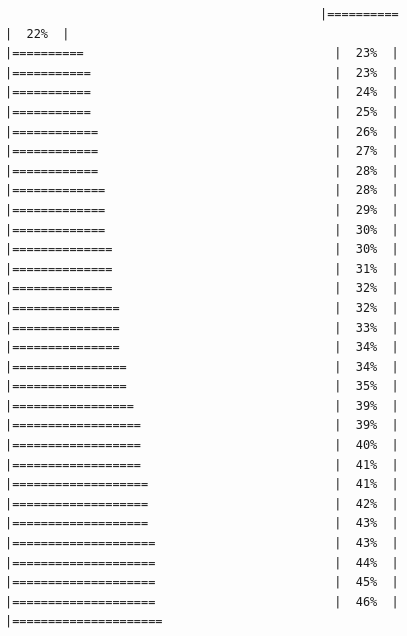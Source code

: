 \documentclass[
  krantz2]{krantz}
\begin{document}
\begin{verbatim}
                                            |==========                                   |  22%  |                                                     |==========                                   |  23%  |                                                     |===========                                  |  23%  |                                                     |===========                                  |  24%  |                                                     |===========                                  |  25%  |                                                     |============                                 |  26%  |                                                     |============                                 |  27%  |                                                     |============                                 |  28%  |                                                     |=============                                |  28%  |                                                     |=============                                |  29%  |                                                     |=============                                |  30%  |                                                     |==============                               |  30%  |                                                     |==============                               |  31%  |                                                     |==============                               |  32%  |                                                     |===============                              |  32%  |                                                     |===============                              |  33%  |                                                     |===============                              |  34%  |                                                     |================                             |  34%  |                                                     |================                             |  35%  |                                                     |=================                            |  39%  |                                                     |==================                           |  39%  |                                                     |==================                           |  40%  |                                                     |==================                           |  41%  |                                                     |===================                          |  41%  |                                                     |===================                          |  42%  |                                                     |===================                          |  43%  |                                                     |====================                         |  43%  |                                                     |====================                         |  44%  |                                                     |====================                         |  45%  |                                                     |====================                         |  46%  |                                                     |=====================             
\end{verbatim}
\end{document}

